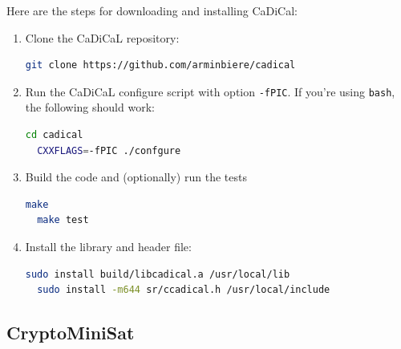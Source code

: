 \documentclass[11pt,twoside,fleqn,openright,titlepage]{cslreport}
\begin{document}
Here are the steps for downloading and installing CaDiCal:
\begin{enumerate}
\item Clone the CaDiCaL repository:
\begin{small}
\begin{lstlisting}[language=sh]
  git clone https://github.com/arminbiere/cadical
\end{lstlisting}
\end{small}
\item Run the CaDiCaL configure script with option \texttt{-fPIC}. If
  you're using \texttt{bash}, the following should work:
\begin{small}
\begin{lstlisting}[language=sh,deletekeywords={cd}]
  cd cadical
  CXXFLAGS=-fPIC ./confgure
\end{lstlisting}
\end{small}
\item Build the code and (optionally) run the tests
\begin{small}
\begin{lstlisting}[language=sh,deletekeywords={test}]
  make
  make test
\end{lstlisting}
\end{small}
\item Install the library and header file:
\begin{small}
\begin{lstlisting}[language=sh]
  sudo install build/libcadical.a /usr/local/lib
  sudo install -m644 sr/ccadical.h /usr/local/include
\end{lstlisting}
\end{small}
\end{enumerate}

\subsection*{CryptoMiniSat}
\end{document}
